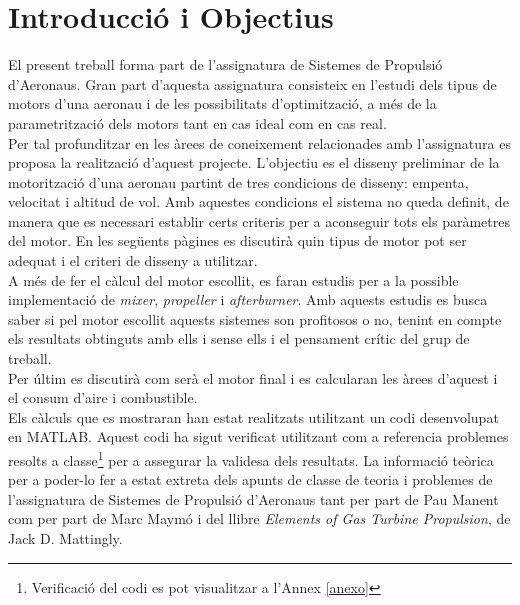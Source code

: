 \section{Introducció i Objectius}
El present treball forma part de l'assignatura de Sistemes de Propulsió d'Aeronaus. Gran part d'aquesta assignatura consisteix en l'estudi dels tipus de motors d'una aeronau i de les possibilitats d'optimització, a més de la parametrització dels motors tant en cas ideal com en cas real.\\
Per tal profunditzar en les àrees de coneixement relacionades amb l'assignatura es proposa la realització d'aquest projecte. L'objectiu es el disseny preliminar de la motorització d'una aeronau partint de tres condicions de disseny: empenta, velocitat i altitud de vol. Amb aquestes condicions el sistema no queda definit, de manera que es necessari establir certs criteris per a aconseguir tots els paràmetres del motor. En les següents pàgines es discutirà quin tipus de motor pot ser adequat i el criteri de disseny a utilitzar.\\
A més de fer el càlcul del motor escollit, es faran estudis per a la possible implementació de \textit{mixer}, \textit{propeller} i \textit{afterburner}. Amb aquests estudis es busca saber si pel motor escollit aquests sistemes son profitosos o no, tenint en compte els resultats obtinguts amb ells i sense ells i el pensament crític del grup de treball.\\

Per últim es discutirà com serà el motor final i es calcularan les àrees d'aquest i el consum d'aire i combustible.\\
Els càlculs que es mostraran han estat realitzats utilitzant un codi desenvolupat en MATLAB. Aquest codi ha sigut verificat utilitzant com a referencia problemes resolts a classe\footnote{Verificació del codi es pot visualitzar a l'Annex \ref{anexo}} per a assegurar la validesa dels resultats. La informació teòrica per a poder-lo fer a estat extreta dels apunts de classe de teoria i problemes de l'assignatura de Sistemes de Propulsió d'Aeronaus tant per part de Pau Manent com per part de Marc Maymó i del llibre \textit{Elements of Gas Turbine Propulsion}, de Jack D. Mattingly. 